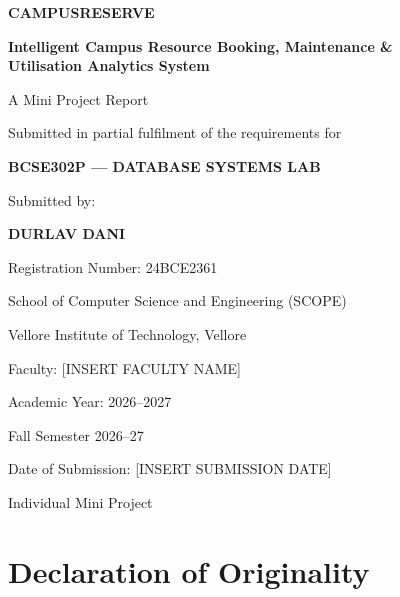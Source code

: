 \documentclass[12pt,a4paper,oneside]{report}
\newcommand{\facultyname}{[INSERT FACULTY NAME]}
\newcommand{\submissiondate}{[INSERT SUBMISSION DATE]}
\renewcommand{\_}{\origus\allowbreak}
\begin{document}
\begin{titlepage}
\centering
\vspace*{0.6cm}
{\fontsize{24}{29}\selectfont\bfseries CAMPUSRESERVE\par}
\vspace{0.5cm}
{\fontsize{15}{20}\selectfont\bfseries Intelligent Campus Resource Booking, Maintenance \&\\ Utilisation Analytics System\par}
\vspace{1.4cm}
{\large A Mini Project Report\par}
\vspace{0.6cm}
{Submitted in partial fulfilment of the requirements for\par}
\vspace{0.3cm}
{\large\bfseries BCSE302P --- DATABASE SYSTEMS LAB\par}
\vspace{1.6cm}
{Submitted by:\par}
\vspace{0.3cm}
{\large\bfseries DURLAV DANI\par}
{Registration Number: 24BCE2361\par}
\vspace{1.4cm}
{School of Computer Science and Engineering (SCOPE)\par}
{Vellore Institute of Technology, Vellore\par}
\vspace{1.0cm}
{Faculty: \facultyname\par}
\vspace{0.3cm}
{Academic Year: 2026--2027\par}
{Fall Semester 2026--27\par}
\vspace{0.3cm}
{Date of Submission: \submissiondate\par}
\vfill
{\small Individual Mini Project}
\end{titlepage}

\setcounter{page}{2}

\chapter*{Declaration of Originality}
\end{document}
